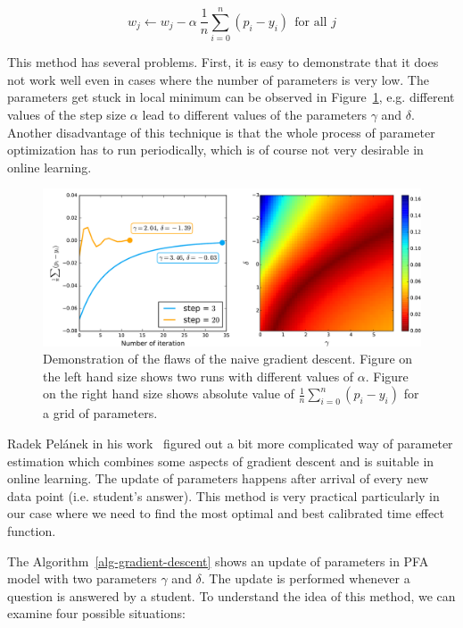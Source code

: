 \begin{equation} \label{online-learning-batch-rule}
 w_j \gets w_j - \alpha~\frac{1}{n}\sum_{i=0}^n (p_i - y_i)~~\text{for all } j
\end{equation}

This method has several problems. First, it is easy to demonstrate that it does not work well even in cases where the number of parameters is very low. The parameters get stuck in local minimum can be observed in Figure~\ref{pfa-dummy-gd-step-vs-grid}, e.g. different values of the step size $\alpha$ lead to different values of the parameters $\gamma$ and $\delta$. Another disadvantage of this technique is that the whole process of parameter optimization has to run periodically, which is of course not very desirable in online learning.

\begin{figure}[htbp]
  \centering
  \includegraphics[width=\textwidth]{img/pfa-dummy-gd-step-vs-grid}
  \caption{Demonstration of the flaws of the naive gradient descent. Figure on the left hand size shows two runs with different values of $\alpha$. Figure on the right hand size shows absolute value of $\frac{1}{n}\sum_{i=0}^n (p_i - y_i)$ for a grid of parameters.}
  \label{pfa-dummy-gd-step-vs-grid}
\end{figure}

Radek Pelánek in his work~\cite{Pelanek2015} figured out a bit more complicated way of parameter estimation which combines some aspects of gradient descent and is suitable in online learning. The update of parameters happens after arrival of every new data point (i.e. student's answer). This method is very practical particularly in our case where we need to find the most optimal and best calibrated time effect function.

The Algorithm~\ref{alg-gradient-descent} shows an update of parameters in PFA model with two parameters $\gamma$ and $\delta$. The update is performed whenever a question is answered by a student. To understand the idea of this method, we can examine four possible situations:

